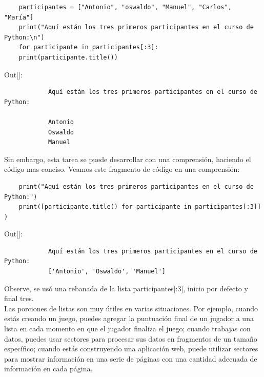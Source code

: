 \hspace{-2.3cm}{\ttfamily \scriptsize porcion.py}\vspace{-0.5cm}
\begin{lstlisting}
	participantes = ["Antonio", "oswaldo", "Manuel", "Carlos", "María"]
	print("Aquí están los tres primeros participantes en el curso de Python:\n")
	for participante in participantes[:3]:
	print(participante.title())
\end{lstlisting}
{\ttfamily\scriptsize\scriptsize\noindent Out[]:\vspace{-0.3cm}	  %
	{\color{blue} 	
		\begin{verbatim}
			Aquí están los tres primeros participantes en el curso de Python:
			
			Antonio
			Oswaldo
			Manuel
		\end{verbatim}
}}

\noindent Sin embargo, esta tarea se puede desarrollar con una comprensión,  haciendo el código mas conciso. Veamos este fragmento de código en una comprensión:

\hspace{-2.9cm}{\ttfamily \scriptsize compresion.py}\vspace{-0.5cm}
\begin{lstlisting}
	print("Aquí están los tres primeros participantes en el curso de Python:")
	print([participante.title() for participante in participantes[:3]] )  
\end{lstlisting} 
{\ttfamily\scriptsize\scriptsize\noindent Out[]:\vspace{-0.25cm}	  %
	{\color{blue} 
		\begin{verbatim}
			Aquí están los tres primeros participantes en el curso de Python:			
			['Antonio', 'Oswaldo', 'Manuel']
		\end{verbatim}
}}Observe, se usó una rebanada de la lista {\ttfamily participantes[:3]}, inicio por defecto y final tres.\\

Las porciones de listas son muy útiles en varias situaciones. Por ejemplo, cuando
estás creando un juego, puedes agregar la puntuación final de un jugador a una lista en cada
momento en que el jugador finaliza el juego; cuando trabajas con datos, puedes usar sectores para procesar sus datos en fragmentos de un tamaño específico; cuando estás construyendo una aplicación web, puede utilizar sectores para mostrar información en una serie de páginas con una cantidad adecuada de información en cada página.



